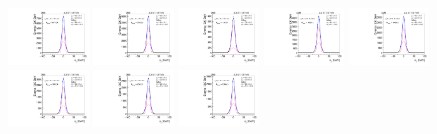 \begin{figure}[htb]
\includegraphics[width=0.19\textwidth]{plots/Appendix_Recoil_Fits/WmpMC_PF_13TeV_2G/pfu2fit_8.pdf}
\includegraphics[width=0.19\textwidth]{plots/Appendix_Recoil_Fits/WmpMC_PF_13TeV_2G/pfu2fit_9.pdf}
\includegraphics[width=0.19\textwidth]{plots/Appendix_Recoil_Fits/WmpMC_PF_13TeV_2G/pfu2fit_19.pdf}
\includegraphics[width=0.19\textwidth]{plots/Appendix_Recoil_Fits/WmpMC_PF_13TeV_2G/pfu2fit_11.pdf}
\includegraphics[width=0.19\textwidth]{plots/Appendix_Recoil_Fits/WmpMC_PF_13TeV_2G/pfu2fit_12.pdf}
\includegraphics[width=0.19\textwidth]{plots/Appendix_Recoil_Fits/WmpMC_PF_13TeV_2G/pfu2fit_13.pdf}
\includegraphics[width=0.19\textwidth]{plots/Appendix_Recoil_Fits/WmpMC_PF_13TeV_2G/pfu2fit_14.pdf}
\includegraphics[width=0.19\textwidth]{plots/Appendix_Recoil_Fits/WmpMC_PF_13TeV_2G/pfu2fit_15.pdf}

\end{figure}
